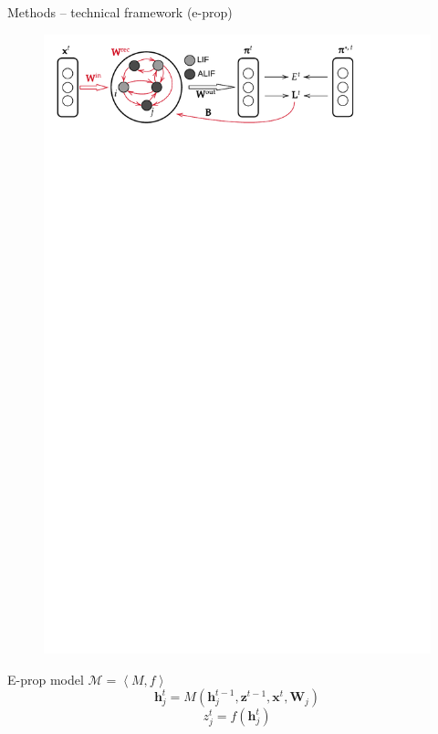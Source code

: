 \documentclass[t]{beamer}
\begin{document}
\begin{frame}{Methods -- technical framework (e-prop)}

  \begin{figure}[!ht]
    \centering
    \includegraphics[trim=0 25cm 0 0, clip, width=\linewidth]{Singlelayer}
  \end{figure}
  E-prop model $\mathcal{M} = \left<M, f\right>$
  \begin{equation}\label{eq:model}
    \mathbf{h}^t_j = M\left(\mathbf{h}_j^{t-1}, \mathbf{z}^{t-1}, \mathbf{x}^t, \mathbf{W}_j\right)
  \end{equation}
  \begin{equation}
  z^t_j = f\left(\mathbf{h}_j^t\right)
  \end{equation}
\end{frame}
\end{document}
